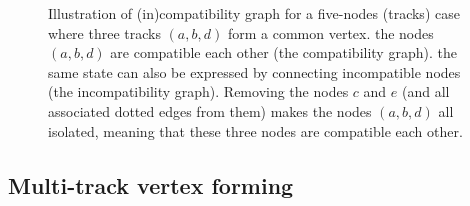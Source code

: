 \documentclass[PUB,UKenglish, texlive=2018]{\ATLASLATEXPATH atlasdoc}
\begin{document}
\begin{figure}[t]
\begin{center}
\hspace{2cm}
\caption{Illustration of (in)compatibility graph for a five-nodes (tracks) case where three tracks $(a,b,d)$ form a common vertex. 
 the nodes $(a,b,d)$ are compatible each other (the compatibility graph). 
 the same state can also be expressed by connecting incompatible nodes (the incompatibility graph). 
Removing the nodes $c$ and $e$ (and all associated dotted edges from them) makes the nodes $(a,b,d)$ all isolated, meaning that these three nodes are compatible each other.}
\label{fig:incompGraph}
\end{center}
\end{figure}

\subsection{Multi-track vertex forming}
\end{document}
